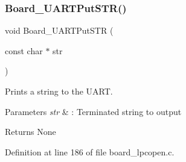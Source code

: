 \subsubsection{\texorpdfstring{Board\+\_\+\+U\+A\+R\+T\+Put\+S\+T\+R()}{Board\_UARTPutSTR()}}
{\footnotesize\ttfamily void Board\+\_\+\+U\+A\+R\+T\+Put\+S\+TR (\begin{DoxyParamCaption}\item[{const char $\ast$}]{str }\end{DoxyParamCaption})}



Prints a string to the U\+A\+RT. 


\begin{DoxyParams}{Parameters}
{\em str} & \+: Terminated string to output \\
\hline
\end{DoxyParams}
\begin{DoxyReturn}{Returns}
None 
\end{DoxyReturn}


Definition at line 186 of file board\+\_\+lpcopen.\+c.

